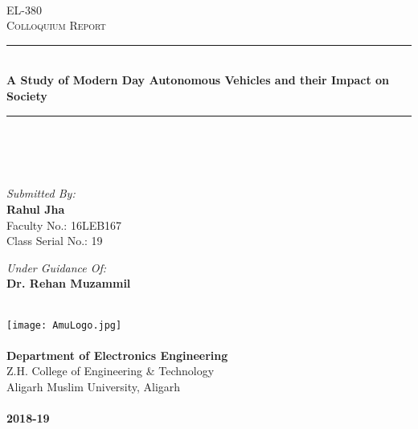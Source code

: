 \begin{titlepage}

\newcommand{\HRule}{\rule{\linewidth}{0.1mm}} 

\thisfancypage{\doublebox}{}
\center
 
\textsc{\Large \\ EL-380}\\[0.5cm]
\textsc{\Large Colloquium Report}\\[0.5cm]

\HRule \\[0.4cm]
{ \Huge \bfseries A Study of Modern Day Autonomous Vehicles and their Impact on
Society}\\[0.1cm]
\HRule \\[0.4cm]
 
\begin{minipage}{0.4\textwidth}
\begin{flushleft} \large

\emph{\\~\\Submitted By:}\\
\textbf{Rahul Jha}\\
Faculty No.: 16LEB167\\ Class Serial No.: 19
\end{flushleft}

\end{minipage}
\begin{minipage}{0.4\textwidth}
\begin{flushright} \large \emph{Under Guidance Of:} \\
\textbf{Dr. Rehan Muzammil}
\end{flushright}
\end{minipage}\\[1cm]

\texttt{[image: AmuLogo.jpg]} %
\\~\\
\large{\textbf{Department of Electronics Engineering}\\
    Z.H. College of Engineering \& Technology\\
    Aligarh Muslim University, Aligarh\\~\\
    
    \textbf{2018-19}
}
\vfill
\end{titlepage}
